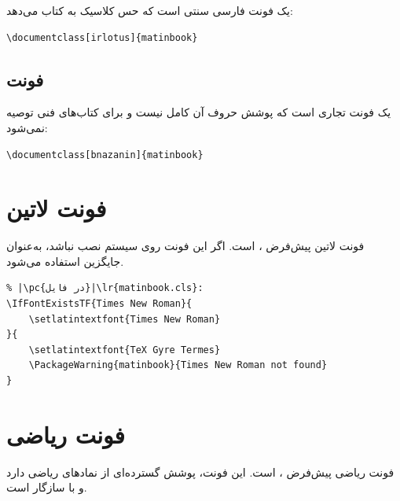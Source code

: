  یک فونت فارسی سنتی است که
حس کلاسیک به کتاب می‌دهد:

\begin{latin}
\begin{verbatim}
\documentclass[irlotus]{matinbook}
\end{verbatim}
\end{latin}

\subsection{فونت }
\label{sec:fonts-bnazanin}

 یک فونت تجاری است که پوشش
حروف آن کامل نیست و برای کتاب‌های فنی
توصیه نمی‌شود:

\begin{latin}
\begin{verbatim}
\documentclass[bnazanin]{matinbook}
\end{verbatim}
\end{latin}


\section{فونت لاتین}
\label{sec:fonts-latin}

فونت لاتین پیش‌فرض ،  است. اگر این فونت روی سیستم
نصب نباشد،  به‌عنوان
جایگزین استفاده می‌شود.

\begin{latin}
\begin{verbatim}
% |\pc{در فایل}|\lr{matinbook.cls}:
\IfFontExistsTF{Times New Roman}{
    \setlatintextfont{Times New Roman}
}{
    \setlatintextfont{TeX Gyre Termes}
    \PackageWarning{matinbook}{Times New Roman not found}
}
\end{verbatim}
\end{latin}


\section{فونت ریاضی}
\label{sec:fonts-math}

فونت ریاضی پیش‌فرض ،  است. این فونت، پوشش گسترده‌ای از
نمادهای ریاضی دارد و با 
سازگار است.

